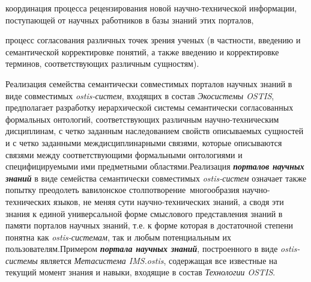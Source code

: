 \begin{SCn}
\begin{scnsubstruct}
{\begin{scnitemize}
\begin{scnitemizeii}
                    \item координация процесса рецензирования новой научно-технической информации, поступающей от научных работников в базы знаний этих порталов,
                    \item  процесс согласования различных точек зрения ученых (в частности, введению и семантической корректировке понятий, а также введению и корректировке терминов, соответствующих различным сущностям).
                \end{scnitemizeii}
            \end{scnitemize}
            Реализация семейства семантически совместимых порталов научных знаний в виде совместимых \textit{\mbox{ostis-систем}}, входящих в состав \textit{Экосистемы OSTIS}, предполагает разработку иерархической системы семантически согласованных формальных онтологий, соответствующих различным научно-техническим дисциплинам, с четко заданным наследованием свойств описываемых сущностей и с четко заданными междисциплинарными связями, которые описываются связями между соответствующими формальными онтологиями и специфицируемыми ими предметными областями.Реализация \textbf{\textit{порталов научных знаний}} в виде семейства семантически совместимых \textit{ostis-систем} означает также попытку преодолеть вавилонское столпотворение\ многообразия научно-технических языков, не меняя сути научно-технических знаний, а сводя эти знания к единой универсальной форме смыслового представления знаний в памяти порталов научных знаний, т.е. к форме которая в достаточной степени понятна как \textit{ostis-системам}, так и любым потенциальным их пользователям.Примером \textbf{\textit{портала научных знаний}}, построенного в виде \textit{ostis-системы} является \textit{Метасистема IMS.ostis}, содержащая все известные на текущий момент знания и навыки, входящие в состав \textit{Технологии OSTIS}.}
        \bigskip
    \end{scnsubstruct}
    \scnendcurrentsectioncomment
\end{SCn}
